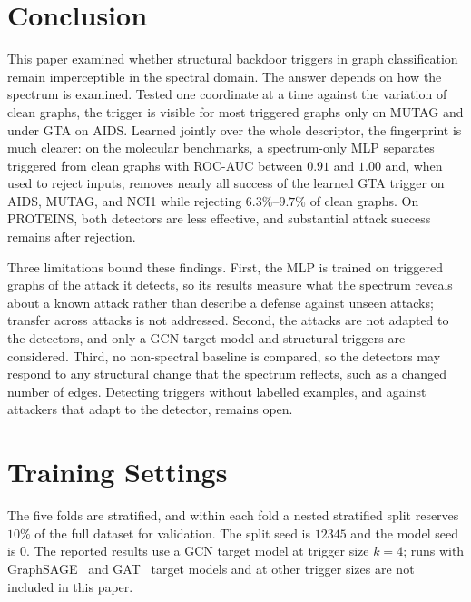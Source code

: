 \documentclass[journal]{IEEEtran}
\begin{document}
\section{Conclusion}
This paper examined whether structural backdoor triggers in graph
classification remain imperceptible in the spectral domain. The answer depends
on how the spectrum is examined. Tested one coordinate at a time against the
variation of clean graphs, the trigger is visible for most triggered graphs
only on MUTAG and under GTA on AIDS. Learned jointly over the whole
descriptor, the fingerprint is much clearer: on the molecular benchmarks, a
spectrum-only MLP separates triggered from clean graphs with ROC-AUC between
$0.91$ and $1.00$ and, when used to reject inputs, removes nearly all success of
the learned GTA trigger on AIDS, MUTAG, and NCI1 while rejecting
$6.3\%$--$9.7\%$ of clean graphs. On PROTEINS, both detectors are less
effective, and substantial attack success remains after rejection.

Three limitations bound these findings. First, the MLP is trained on triggered
graphs of the attack it detects, so its results measure what the spectrum
reveals about a known attack rather than describe a defense against unseen
attacks; transfer across attacks is not addressed. Second, the attacks are not
adapted to the detectors, and only a GCN target model and structural triggers
are considered. Third, no non-spectral baseline is compared, so the detectors
may respond to any structural change that the spectrum reflects, such as a
changed number of edges. Detecting triggers without labelled examples, and
against attackers that adapt to the detector, remains open.


%
\newpage


\newpage
\appendices

\section{Training Settings}
\label{app:training}
The five folds are stratified, and within each fold a nested stratified
split reserves $10\%$ of the full dataset for validation. The split seed is
$12345$ and the model seed is $0$. The reported results use a GCN target
model at trigger size $k=4$; runs with GraphSAGE~\cite{graphsage} and
GAT~\cite{gat} target models and at other trigger sizes are not included in
this paper.
\end{document}
